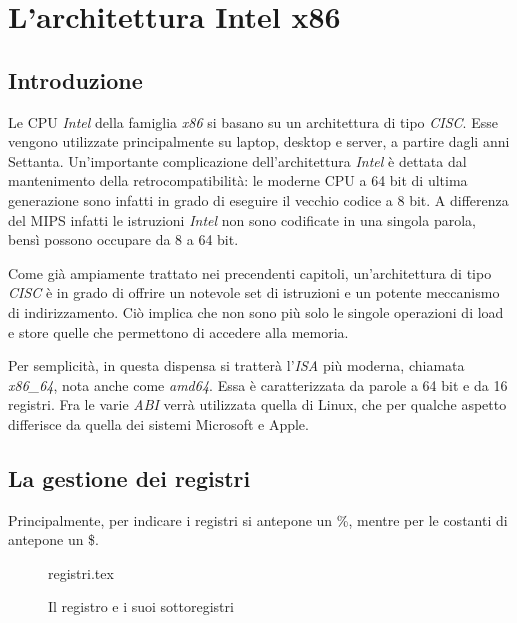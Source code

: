 \documentclass[class=book, crop=false, oneside]{standalone}
\begin{document}
\chapter{L'architettura Intel x86}

\section{Introduzione}
Le CPU \emph{Intel} della famiglia \emph{x86} si basano su un architettura di tipo \emph{CISC}. Esse vengono utilizzate principalmente su laptop, desktop e server, a partire dagli anni Settanta. Un'importante complicazione dell'architettura \emph{Intel} è dettata dal mantenimento della retrocompatibilità: le moderne CPU a 64 bit di ultima generazione sono infatti in grado di eseguire il vecchio codice a 8 bit. A differenza del MIPS infatti le istruzioni \emph{Intel} non sono codificate in una singola parola, bensì possono occupare da 8 a 64 bit.

Come già ampiamente trattato nei precendenti capitoli, un'architettura di tipo \emph{CISC} è in grado di offrire un notevole set di istruzioni e un potente meccanismo di indirizzamento. Ciò implica che non sono più solo le singole operazioni di load e store quelle che permettono di accedere alla memoria.

Per semplicità, in questa dispensa si tratterà l'\emph{ISA} più moderna, chiamata \emph{x86\_64}, nota anche come \emph{amd64}. Essa è caratterizzata da parole a 64 bit e da 16 registri. Fra le varie \emph{ABI} verrà utilizzata quella di Linux, che per qualche aspetto differisce da quella dei sistemi Microsoft e Apple.

\section{La gestione dei registri}
Principalmente, per indicare i registri si antepone un \%, mentre per le costanti di antepone un \$.

\begin{figure}[H]
	\centering
	{registri.tex}
	\caption{Il registro  e i suoi sottoregistri}
\end{figure}
\end{document}
